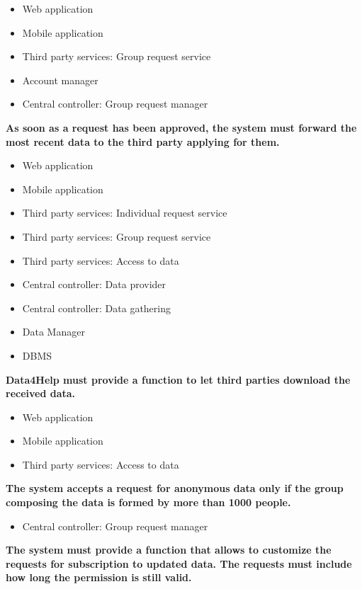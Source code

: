 \begin{enumerate} [label={\bf[R\arabic*]}]
        \begin{itemize}
            \item Web application
            \item Mobile application
            \item Third party services: Group request service
            \item Account manager
            \item Central controller: Group request manager
        \end{itemize}
    \item \textbf{As soon as a request has been approved, the system must forward the most recent data to the third party applying for them.}
        \begin{itemize}
            \item Web application
            \item Mobile application
            \item Third party services: Individual request service
            \item Third party services: Group request service
            \item Third party services: Access to data
            \item Central controller: Data provider
            \item Central controller: Data gathering
            \item Data Manager
            \item DBMS
        \end{itemize}
    \item \textbf{Data4Help must provide a function to let third parties download the received data.}
        \begin{itemize}
            \item Web application
            \item Mobile application
             \item Third party services: Access to data
        \end{itemize}
    \item \textbf{The system accepts a request for anonymous data only if the group composing the data is formed by more than 1000 people.}
        \begin{itemize}
            \item Central controller: Group request manager
        \end{itemize}
    \item \textbf{The system must provide a function that allows to customize the requests for subscription to updated data. The requests must include how long the permission is still valid.}

\end{enumerate}
